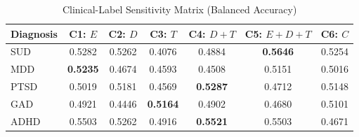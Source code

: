 \begin{table}[!t]
\caption{Clinical-Label Sensitivity Matrix (Balanced Accuracy)}
\label{tab:clinical_matrix}
\centering
\footnotesize
\begin{tabular}{lcccccc}
\hline
Diagnosis & C1: $E$ & C2: $D$ & C3: $T$ & C4: $D+T$ & C5: $E+D+T$ & C6: $C$ \\
\hline
SUD  & 0.5282 & 0.5262 & 0.4076 & 0.4884 & \textbf{0.5646} & 0.5254 \\
MDD  & \textbf{0.5235} & 0.4674 & 0.4593 & 0.4508 & 0.5151 & 0.5016 \\
PTSD & 0.5019 & 0.5181 & 0.4569 & \textbf{0.5287} & 0.4712 & 0.5148 \\
GAD  & 0.4921 & 0.4446 & \textbf{0.5164} & 0.4902 & 0.4680 & 0.5101 \\
ADHD & 0.5503 & 0.5262 & 0.4916 & \textbf{0.5521} & 0.5503 & 0.4671 \\
\hline
\end{tabular}
\end{table}
